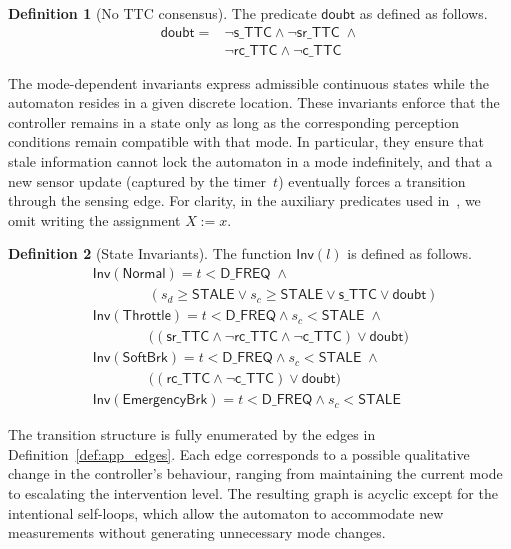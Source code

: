 \documentclass[journal]{IEEEtran}
\theoremstyle{definition}
\newtheorem{definition}{Definition}
\theoremstyle{property}
\newcommand{\inv}[1]{\mathsf{Inv}(\mathsf{#1})}
\newcommand{\thr}[1]{\mathsf{#1}}
\newcommand{\validD}{\mathsf{valid\_d}}
\newcommand{\validC}{\mathsf{valid\_c}}
\newcommand{\sd}{\mathsf{s\_TTC}}
\newcommand{\srd}{\mathsf{sr\_TTC}}
\newcommand{\rcd}{\mathsf{rc\_TTC}}
\newcommand{\cd}{\mathsf{c\_TTC}}
\newcommand{\unc}{\mathsf{doubt}}
\newcommand{\Normal}{\mathsf{Normal}}
\newcommand{\Warning}{\mathsf{Warning}}
\newcommand{\Throttle}{\mathsf{Throttle}}
\newcommand{\SoftBrake}{\mathsf{SoftBrk}}
\newcommand{\EmergencyBrake}{\mathsf{EmergencyBrk}}
\begin{document}
\begin{definition}[No TTC consensus]\label{def:app_uncertain}
The predicate $\unc$ as defined as follows.
    \[
    \begin{aligned}
        \unc = &\neg \sd \land \neg \srd \; \land \\ 
        &\neg \rcd \land \neg \cd
    \end{aligned}
    \]
\end{definition}

The mode-dependent invariants express admissible continuous states while the automaton resides in a given discrete location. These invariants enforce that the controller remains in a state only as long as the corresponding perception conditions remain compatible with that mode. In particular, they ensure that stale information cannot lock the automaton in a mode indefinitely, and that a new sensor update (captured by the timer~$t$) eventually forces a transition through the sensing edge.
For clarity, in the auxiliary predicates used in~, we omit writing the assignment $X := x$. 
\begin{definition}[State Invariants]\label{def:inv}
The function $\thr{Inv}(l)$ is defined as follows. 
\[
\begin{aligned}
&\inv{\Normal} = t < \thr{D\_FREQ} \; \land \\
&\qquad\qquad(s_d \geq \thr{STALE} \lor  s_c \geq \thr{STALE} \lor \sd \lor \unc) \\
&\inv{\Throttle} = t < \thr{D\_FREQ} \land  s_c < \thr{STALE} \; \land \\ 
&\qquad\qquad \big((\srd \land \neg \rcd \land \neg \cd) \lor \unc \big)\\
&\inv{\SoftBrake} = t < \thr{D\_FREQ} \land s_c < \thr{STALE} \; \land \\ 
&\qquad\qquad \big( (\rcd \land \neg \cd) \lor \unc \big) \\
&\inv{\EmergencyBrake} = t < \thr{D\_FREQ} \land s_c < \thr{STALE}
\end{aligned}
\]
\end{definition}

The transition structure is fully enumerated by the edges in Definition~\ref{def:app_edges}. Each edge corresponds to a possible qualitative change in the controller’s behaviour, ranging from maintaining the current mode to escalating the intervention level. The resulting graph is acyclic except for the intentional self-loops, which allow the automaton to accommodate new measurements without generating unnecessary mode changes.
\end{document}
